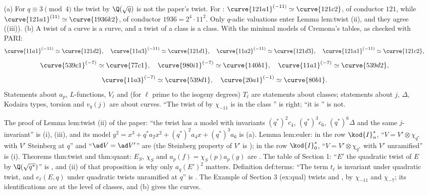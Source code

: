 \begin{warning}\label{warn:ellcurves:twists}
(a) For $q\equiv3\pmod4$ the twist by $\Q(\sqrt q)$ is not the paper's twist. For : $\curve{121a1}^{(-11)}\simeq\curve{121c2}$, of conductor $121$, while $\curve{121a1}^{(11)}\simeq\curve{1936k2}$,
of conductor $1936=2^4\cdot11^2$. Only $q$-adic valuations enter Lemma lem:twist (ii), and they agree ((iii)).
(b) A twist of a curve is a curve, and a twist of a class is a class. With the minimal models of Cremona's tables, as checked with PARI:
\[
\curve{11a1}^{(-11)}\simeq\curve{121d2},\quad\curve{11a3}^{(-11)}\simeq\curve{121d1},\quad\curve{11a2}^{(-11)}\simeq\curve{121d3},\quad\curve{121a1}^{(-11)}\simeq\curve{121c2},
\]
\[
\curve{539c1}^{(-7)}\simeq\curve{77c1},\quad\curve{980i1}^{(-7)}\simeq\curve{140b1},\quad\curve{11a1}^{(-7)}\simeq\curve{539d2},
\]
\[
\curve{11a3}^{(-7)}\simeq\curve{539d1},\quad\curve{20a1}^{(-1)}\simeq\curve{80b1}.
\]
Statements about $a_p$, $L$-functions, $V_\ell$ and (for $\ell$ prime to the isogeny degrees) $T_\ell$ are statements about classes; statements about $j$, $\Delta$, Kodaira types, torsion and $v_q(j)$ are
about curves. ``The twist of  by $\chi_{-11}$ is in the class '' is right; ``it is '' is not.
\end{warning}

\begin{paperlink}\label{pl:ellcurves:twist}
The proof of Lemma lem:twist (ii) of the paper: ``the twist has a model with invariants $(q^*)^{2}c_4$, $(q^*)^{3}c_6$, $(q^*)^{6}\Delta$ and the same $j$-invariant'' is (i), (iii), and its
model $y^2=x^3+q^*a_2x^2+(q^*)^2a_4x+(q^*)^3a_6$ is (a). Lemma lem:euler: in the row $\kod{I}_n^*$, ``$V=V'\otimes\chi_{q^*}$ with $V'$ Steinberg at $q$'' and ``$\ad V=\ad V'$'' are  (the
Steinberg property of $V'$ is ); in the row $\kod{I}_0^*$, ``$V=V'\otimes\chi_{q^*}$ with $V'$ unramified'' is (i). Theorems thm:twist and thm:quant: $E_S$, $\chi_S$ and $a_p(f)=\chi_S(p)a_p(g)$ are . The table of Section 1: ``$E'$ the quadratic twist of
$E$ by $\Q(\sqrt{q^*})$'' is , and (ii) of that proposition is why only $a_q(E')^2$ matters. Definition def:terms: ``The term $t_\ell$ is invariant under quadratic twist, and
$e_\ell(E,q)$ under quadratic twists unramified at $q$'' is . The Example of Section 3 (ex:qual) twists  and ,  by
$\chi_{-11}$ and $\chi_{-7}$; its identifications are at the level of classes, and (b) gives the curves.
\end{paperlink}
